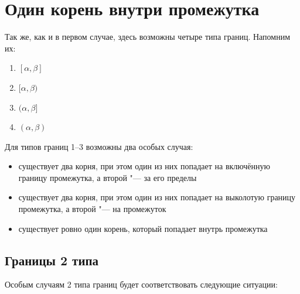 \section {Один корень внутри промежутка}

Так же, как и в первом случае, здесь возможны четыре типа границ. Напомним их:

\begin {enumerate} [labelindent=\parindent, leftmargin=*]
    \item {$[\alpha, \beta]$}
    \item {$[\alpha, \beta)$}
    \item {$(\alpha, \beta]$}
    \item {$(\alpha, \beta)$}
\end {enumerate}

Для типов границ 1--3 возможны два особых случая: 

\begin {itemize}
    \item {существует два корня, при этом один из них попадает на включённую границу промежутка, а 
           второй "--- за его пределы}
    \item {существует два корня, при этом один из них попадает на выколотую границу промежутка, а 
           второй "--- на промежуток}
    \item {существует ровно один корень, который попадает внутрь промежутка}
\end {itemize}

\subsection {Границы 2 типа}

Особым случаям 2 типа границ будет соответствовать следующие ситуации:

